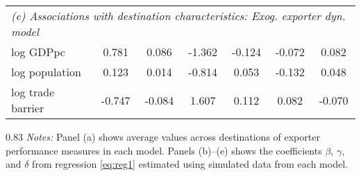 \begin{table}[h!]
\begin{center}
\begin{tabular}{lcccccc}
\midrule\multicolumn{7}{l}{\textit{(e) Associations with destination characteristics: Exog. exporter dyn. model}}\\
log GDPpc& 0.781& 0.086& -1.362& -0.124& -0.072& 0.082\\
log population& 0.123& 0.014& -0.814& 0.053& -0.132& 0.048\\
log trade barrier& -0.747& -0.084& 1.607& 0.112& 0.082& -0.070\\
\bottomrule
\end{tabular}
\begin{fignote2}{0.83\textwidth}
\textit{Notes:} Panel (a) shows average values across destinations of exporter performance measures in each model. Panels (b)--(e) shows the coefficients $\beta$, $\gamma$, and $\delta$ from regression \eqref{eq:reg1} estimated using simulated data from each model.
\end{fignote2}
\end{center}
\normalsize
\end{table}
